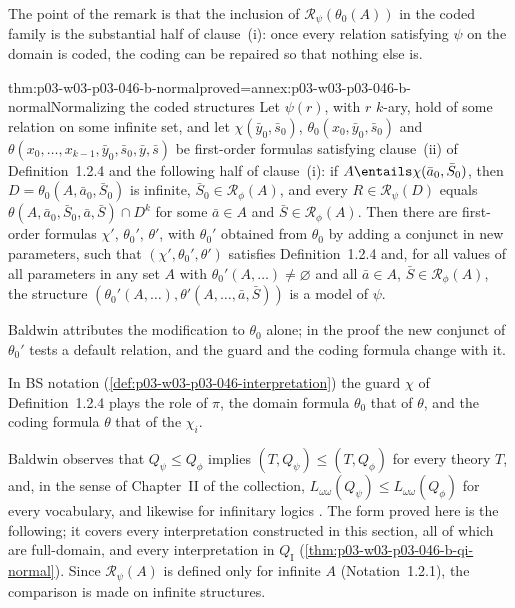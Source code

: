 The point of the remark is that the inclusion of
\(\mathscr R_\psi(\theta_0(A))\) in the coded family is the substantial half
of clause~(i): once every relation satisfying \(\psi\) on the domain is
coded, the coding can be repaired so that nothing else is.

\begin{hblemma}{thm:p03-w03-p03-046-b-normal}{proved=annex:p03-w03-p03-046-b-normal}{Normalizing the coded structures}
Let \(\psi(r)\), with \(r\) \(k\)-ary, hold of some relation on some
infinite set, and let \(\chi(\bar y_0,\bar s_0)\),
\(\theta_0(x_0,\bar y_0,\bar s_0)\) and
\(\theta(x_0,\dots,x_{k-1},\bar y_0,\bar s_0,\bar y,\bar s)\) be
first-order formulas satisfying clause~(ii) of Definition~1.2.4 and the
following half of clause~(i): if \(A\entails\chi(\bar a_0,\bar S_0)\), then
\(D=\theta_0(A,\bar a_0,\bar S_0)\) is infinite, \(\bar S_0\in\mathscr
R_\phi(A)\), and every \(R\in\mathscr R_\psi(D)\) equals
\(\theta(A,\bar a_0,\bar S_0,\bar a,\bar S)\cap D^k\) for some \(\bar a\in
A\) and \(\bar S\in\mathscr R_\phi(A)\). Then there are first-order formulas
\(\chi'\), \(\theta_0'\), \(\theta'\), with \(\theta_0'\) obtained from
\(\theta_0\) by adding a conjunct in new parameters, such that
\((\chi',\theta_0',\theta')\) satisfies Definition~1.2.4 and, for all
values of all parameters in any set \(A\) with
\(\theta_0'(A,\dots)\neq\varnothing\) and all \(\bar a\in A\), \(\bar
S\in\mathscr R_\phi(A)\), the structure
\((\theta_0'(A,\dots),\theta'(A,\dots,\bar a,\bar S))\) is a model of
\(\psi\).
\end{hblemma}

Baldwin attributes the modification to \(\theta_0\) alone; in the proof the
new conjunct of \(\theta_0'\) tests a default relation, and the guard and the
coding formula change with it.

In BS notation (\cref{def:p03-w03-p03-046-interpretation}) the guard
\(\chi\) of Definition~1.2.4 plays the role of \(\pi\), the domain formula
\(\theta_0\) that of \(\theta\), and the coding formula \(\theta\) that of
the \(\chi_i\).

Baldwin observes that \(Q_\psi\le Q_\phi\) implies
\((T,Q_\psi)\le(T,Q_\phi)\) for every theory \(T\), and, in the sense of
Chapter~II of the collection, \(L_{\omega\omega}(Q_\psi)\le
L_{\omega\omega}(Q_\phi)\) for every vocabulary, and likewise for
infinitary logics \cite[p.~448]{Baldwin1985DSOQ}. The form proved here is
the following; it covers every interpretation constructed in this
section, all of which are full-domain, and every interpretation in
\(Q_{\mathrm I}\) (\cref{thm:p03-w03-p03-046-b-qi-normal}). Since
\(\mathscr R_\psi(A)\) is defined only for infinite \(A\) (Notation~1.2.1),
the comparison is made on infinite structures.

